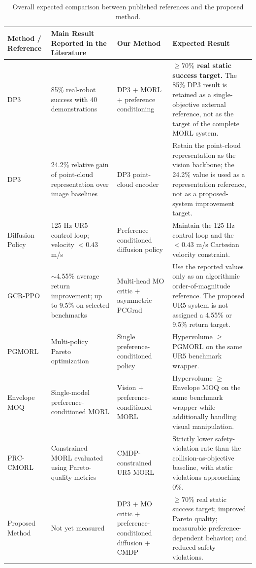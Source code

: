 \documentclass[journal]{IEEEtran}
\begin{document}
\begin{table}[t]
\centering
\caption{Overall expected comparison between published references and
the proposed method.}
\label{tab:overall_expected}
\renewcommand{\arraystretch}{1.35}
\setlength{\tabcolsep}{4pt}

\begin{tabular}{L{2.2cm} L{3.2cm} L{3.2cm} L{5.0cm}}
\toprule
\textbf{Method / Reference}
&
\textbf{Main Result Reported in the Literature}
&
\textbf{Our Method}
&
\textbf{Expected Result}
\\
\midrule

DP3 \cite{ze2024}
&
85\% real-robot success with 40 demonstrations
&
DP3 + MORL + preference conditioning
&
\textbf{$\geq70\%$ real static success target.}
The 85\% DP3 result is retained as a single-objective
external reference, not as the target of the complete MORL system.
\\

DP3 \cite{ze2024}
&
24.2\% relative gain of point-cloud representation over image
baselines
&
DP3 point-cloud encoder
&
Retain the point-cloud representation as the vision backbone;
the 24.2\% value is used as a representation reference, not as a
proposed-system improvement target.
\\

Diffusion Policy \cite{chi2023}
&
125 Hz UR5 control loop; velocity $<0.43$ m/s
&
Preference-conditioned diffusion policy
&
Maintain the 125 Hz control loop and the
$<0.43$ m/s Cartesian velocity constraint.
\\

GCR-PPO \cite{munn2025}
&
$\sim$4.55\% average return improvement; up to 9.5\% on selected
benchmarks
&
Multi-head MO critic + asymmetric PCGrad
&
Use the reported values only as an algorithmic
order-of-magnitude reference. The proposed UR5 system is not assigned
a 4.55\% or 9.5\% return target.
\\

PGMORL \cite{xu2020}
&
Multi-policy Pareto optimization
&
Single preference-conditioned policy
&
Hypervolume $\geq$ PGMORL on the same UR5 benchmark wrapper.
\\

Envelope MOQ \cite{yang2019}
&
Single-model preference-conditioned MORL
&
Vision + preference-conditioned MORL
&
Hypervolume $\geq$ Envelope MOQ on the same benchmark wrapper while
additionally handling visual manipulation.
\\

PRC-CMORL \cite{he2023}
&
Constrained MORL evaluated using Pareto-quality metrics
&
CMDP-constrained UR5 MORL
&
Strictly lower safety-violation rate than the
collision-as-objective baseline, with static violations approaching
0\%.
\\

Proposed Method
&
Not yet measured
&
DP3 + MO critic + preference-conditioned diffusion + CMDP
&
$\geq70\%$ real static success target; improved Pareto quality;
measurable preference-dependent behavior; and reduced safety
violations.
\\

\bottomrule
\end{tabular}
\end{table}
\end{document}
